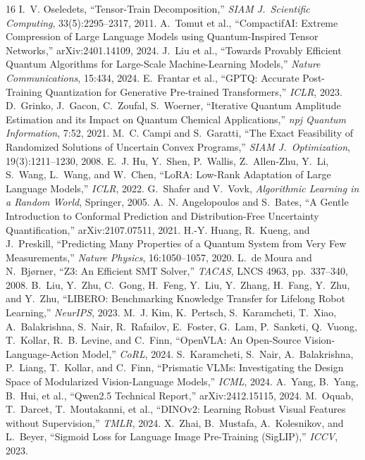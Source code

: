 \documentclass[conference,10pt]{IEEEtran}
\begin{document}
\begin{thebibliography}{16}
 I.~V. Oseledets, ``Tensor-Train Decomposition,'' \emph{SIAM
J.\ Scientific Computing}, 33(5):2295--2317, 2011.
 A.~Tomut et al., ``CompactifAI: Extreme Compression of Large
Language Models using Quantum-Inspired Tensor Networks,''
arXiv:2401.14109, 2024.
 J.~Liu et al., ``Towards Provably Efficient Quantum Algorithms
for Large-Scale Machine-Learning Models,'' \emph{Nature Communications},
15:434, 2024.
 E.~Frantar et al., ``GPTQ: Accurate Post-Training
Quantization for Generative Pre-trained Transformers,'' \emph{ICLR}, 2023.
 D.~Grinko, J.~Gacon, C.~Zoufal, S.~Woerner, ``Iterative
Quantum Amplitude Estimation and its Impact on Quantum Chemical Applications,''
\emph{npj Quantum Information}, 7:52, 2021.
 M.~C. Campi and S.~Garatti, ``The Exact Feasibility of
Randomized Solutions of Uncertain Convex Programs,'' \emph{SIAM J.\
Optimization}, 19(3):1211--1230, 2008.
 E.~J. Hu, Y.~Shen, P.~Wallis, Z.~Allen-Zhu, Y.~Li, S.~Wang,
L.~Wang, and W.~Chen, ``LoRA: Low-Rank Adaptation of Large Language Models,'' \emph{ICLR}, 2022.
\bibitem{vovk05} G.~Shafer and V.~Vovk, \emph{Algorithmic Learning in a Random
World}, Springer, 2005.
 A.~N. Angelopoulos and S.~Bates, ``A Gentle
Introduction to Conformal Prediction and Distribution-Free Uncertainty
Quantification,'' arXiv:2107.07511, 2021.
 H.-Y. Huang, R.~Kueng, and J.~Preskill, ``Predicting Many
Properties of a Quantum System from Very Few Measurements,'' \emph{Nature
Physics}, 16:1050--1057, 2020.
 L.~de Moura and N.~Bj{\o}rner, ``Z3: An Efficient SMT
Solver,'' \emph{TACAS}, LNCS 4963, pp.~337--340, 2008.
 B.~Liu, Y.~Zhu, C.~Gong, H.~Feng, Y.~Liu, Y.~Zhang,
H.~Fang, Y.~Zhu, and Y.~Zhu, ``LIBERO: Benchmarking Knowledge Transfer for
Lifelong Robot Learning,'' \emph{NeurIPS}, 2023.
 M.~J. Kim, K.~Pertsch, S.~Karamcheti, T.~Xiao, A.~Balakrishna,
S.~Nair, R.~Rafailov, E.~Foster, G.~Lam, P.~Sanketi, Q.~Vuong, T.~Kollar,
R.~B. Levine, and C.~Finn, ``OpenVLA: An Open-Source Vision-Language-Action
Model,'' \emph{CoRL}, 2024.
 S.~Karamcheti, S.~Nair, A.~Balakrishna, P.~Liang,
T.~Kollar, and C.~Finn, ``Prismatic VLMs: Investigating the Design Space of
Modularized Vision-Language Models,'' \emph{ICML}, 2024.
 A.~Yang, B.~Yang, B.~Hui, et al., ``Qwen2.5 Technical
Report,'' arXiv:2412.15115, 2024.
 M.~Oquab, T.~Darcet, T.~Moutakanni, et al., ``DINOv2:
Learning Robust Visual Features without Supervision,'' \emph{TMLR}, 2024.
\bibitem{zhai23} X.~Zhai, B.~Mustafa, A.~Kolesnikov, and L.~Beyer, ``Sigmoid
Loss for Language Image Pre-Training (SigLIP),'' \emph{ICCV}, 2023.
\end{thebibliography}
\end{document}

